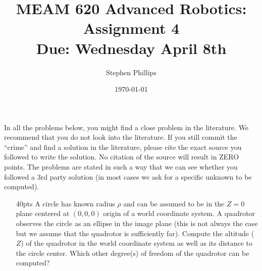 \documentclass[11pt,english]{article}
\title{MEAM 620 Advanced Robotics: Assignment 4\\
Due:  Wednesday April 8th}
\author{Stephen Phillips}
\date{\today}
\begin{document}
\maketitle
In all the problems below, you might find a close problem in the literature. We recommend that you do not look into the literature. If you still commit the ``crime'' and find a solution in the literature, please cite the exact source you followed to write the solution. 
No citation of the source will result in ZERO points. The problems are stated in such a way that we can see whether you followed a 3rd party solution (in most cases we ask for a specific unknown to be computed).


\begin{enumerate}

\item [40pts]
 A circle has known radius $\rho$ and can be assumed to be in the $Z=0$ plane centered at $(0,0,0)$ origin of a world coordinate system. A quadrotor observes the circle as an ellipse in the image plane (this is not always the case but we assume that the quadrotor is sufficiently far). Compute the altitude ($Z$) of the quadrotor in the world coordinate system as well as its distance to the circle center. 
Which other degree(s) of freedom of the quadrotor can be computed?


\end{enumerate}
\end{document}
